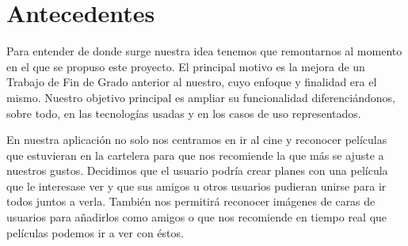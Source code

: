 


\section{Antecedentes}
\label{makereference1.1}

Para entender de donde surge nuestra idea tenemos que remontarnos al momento en el que se propuso este proyecto.
El principal motivo es la mejora de un Trabajo de Fin de Grado anterior
 al nuestro\cite{TFGRA16}, cuyo enfoque y finalidad era el mismo. Nuestro objetivo principal es 
 ampliar su funcionalidad diferenciándonos, sobre todo, en las tecnologías usadas y 
 en los casos de uso representados.

 En nuestra aplicación no solo nos centramos en ir al cine y reconocer películas que estuvieran en la cartelera
 para que nos recomiende la que más se ajuste a nuestros gustos. Decidimos que el usuario podría crear planes con
 una película que le interesase ver y que sus amigos u otros usuarios pudieran unirse para ir todos juntos a verla.
También nos permitirá reconocer imágenes de caras de usuarios para añadirlos como amigos o que nos recomiende en tiempo real
 que películas podemos ir a ver con éstos.

